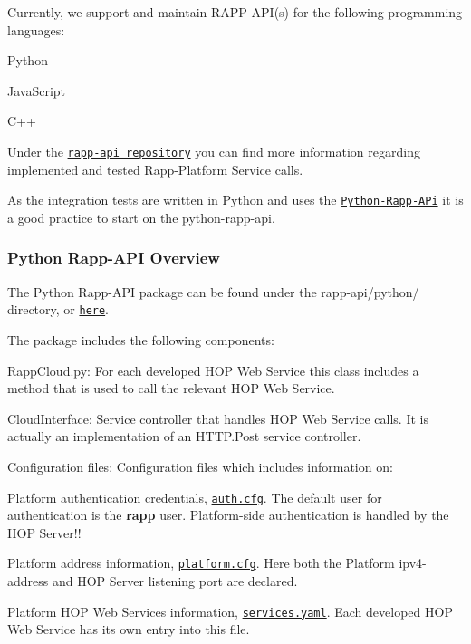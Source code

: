 Currently, we support and maintain R\-A\-P\-P-\/\-A\-P\-I(s) for the following programming languages\-:


\begin{DoxyItemize}
\item Python
\item Java\-Script
\item C++
\end{DoxyItemize}

Under the \href{https://github.com/rapp-project/rapp-api}{\tt rapp-\/api repository} you can find more information regarding implemented and tested Rapp-\/\-Platform Service calls.

As the integration tests are written in Python and uses the \href{https://github.com/rapp-project/rapp-api/tree/master/python}{\tt Python-\/\-Rapp-\/\-A\-Pi} it is a good practice to start on the python-\/rapp-\/api.

\subsubsection*{Python Rapp-\/\-A\-P\-I Overview}

The Python Rapp-\/\-A\-P\-I package can be found under the rapp-\/api/python/ directory, or \href{https://github.com/rapp-project/rapp-api/tree/master/python}{\tt here}.

The package includes the following components\-:


\begin{DoxyItemize}
\item Rapp\-Cloud.\-py\-: For each developed H\-O\-P Web Service this class includes a method that is used to call the relevant H\-O\-P Web Service.
\item Cloud\-Interface\-: Service controller that handles H\-O\-P Web Service calls. It is actually an implementation of an H\-T\-T\-P.\-Post service controller.
\item Configuration files\-: Configuration files which includes information on\-:
\begin{DoxyItemize}
\item Platform authentication credentials, \href{https://github.com/rapp-project/rapp-api/blob/master/python/RappCloud/config/auth.cfg}{\tt auth.\-cfg}. The default user for authentication is the {\bfseries rapp} user. Platform-\/side authentication is handled by the H\-O\-P Server!!
\item Platform address information, \href{https://github.com/rapp-project/rapp-api/blob/master/python/RappCloud/config/platform.cfg}{\tt platform.\-cfg}. Here both the Platform ipv4-\/address and H\-O\-P Server listening port are declared.
\item Platform H\-O\-P Web Services information, \href{https://github.com/rapp-project/rapp-api/blob/master/python/RappCloud/config/services.yaml}{\tt services.\-yaml}. Each developed H\-O\-P Web Service has its own entry into this file.
\end{DoxyItemize}
\end{DoxyItemize}

